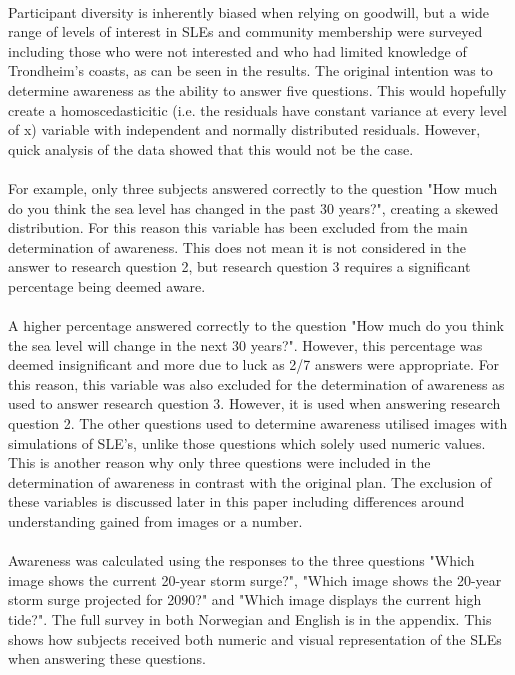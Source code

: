 \paragraph{}
Participant diversity is inherently biased when relying on goodwill, but a wide range of levels of interest in SLEs and community membership were surveyed including those who were not interested and who had limited knowledge of Trondheim’s coasts, as can be seen in the results. The original intention was to determine awareness as the ability to answer five questions. This would hopefully create a homoscedasticitic (i.e. the residuals have constant variance at every level of x) variable with independent and normally distributed residuals. However, quick analysis of the data showed that this would not be the case.
\paragraph{}
For example, only three subjects answered correctly to the question "How much do you think the sea level has changed in the past 30 years?", creating a skewed distribution. For this reason this variable has been excluded from the main determination of awareness. This does not mean it is not considered in the answer to research question 2, but research question 3 requires a significant percentage being deemed aware. 
\paragraph{}
A higher percentage answered correctly to the question "How much do you think the sea level will change in the next 30 years?". However, this percentage was deemed insignificant and more due to luck as 2/7 answers were appropriate. For this reason, this variable was also excluded for the determination of awareness as used to answer research question 3. However, it is used when answering research question 2. The other questions used to determine awareness utilised images with simulations of SLE's, unlike those questions which solely used numeric values. This is another reason why only three questions were included in the determination of awareness in contrast with the original plan. The exclusion of these variables is discussed later in this paper including differences around understanding gained from images or a number.
\paragraph{}
Awareness was calculated using the responses to the three questions "Which image shows the current 20-year storm surge?", "Which image shows the 20-year storm surge projected for 2090?" and "Which image displays the current high tide?". The full survey in both Norwegian and English is in the appendix. This shows how subjects received both numeric and visual representation of the SLEs when answering these questions. 



